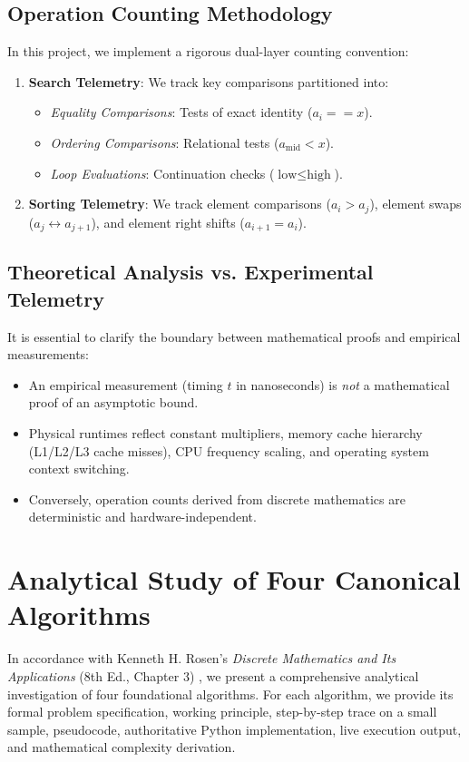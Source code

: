\documentclass[11pt,a4paper,oneside]{report}
\theoremstyle{definition}
\begin{document}
\section{Operation Counting Methodology}
In this project, we implement a rigorous dual-layer counting convention:
\begin{enumerate}
    \item \textbf{Search Telemetry}: We track key comparisons partitioned into:
    \begin{itemize}
        \item \emph{Equality Comparisons}: Tests of exact identity ($a_i == x$).
        \item \emph{Ordering Comparisons}: Relational tests ($a_{\text{mid}} < x$).
        \item \emph{Loop Evaluations}: Continuation checks ($\text{low} \le \text{high}$).
    \end{itemize}
    \item \textbf{Sorting Telemetry}: We track element comparisons ($a_i > a_j$), element swaps ($a_j \leftrightarrow a_{j+1}$), and element right shifts ($a_{i+1} = a_i$).
\end{enumerate}

\section{Theoretical Analysis vs. Experimental Telemetry}
It is essential to clarify the boundary between mathematical proofs and empirical measurements:
\begin{itemize}
    \item An empirical measurement (timing $t$ in nanoseconds) is \emph{not} a mathematical proof of an asymptotic bound.
    \item Physical runtimes reflect constant multipliers, memory cache hierarchy (L1/L2/L3 cache misses), CPU frequency scaling, and operating system context switching.
    \item Conversely, operation counts derived from discrete mathematics are deterministic and hardware-independent.
\end{itemize}

\chapter{Analytical Study of Four Canonical Algorithms}
\label{chap:analytical_study}

In accordance with Kenneth H. Rosen's \emph{Discrete Mathematics and Its Applications} (8th Ed., Chapter 3) \cite{rosen2019discrete}, we present a comprehensive analytical investigation of four foundational algorithms. For each algorithm, we provide its formal problem specification, working principle, step-by-step trace on a small sample, pseudocode, authoritative Python implementation, live execution output, and mathematical complexity derivation.
\end{document}
